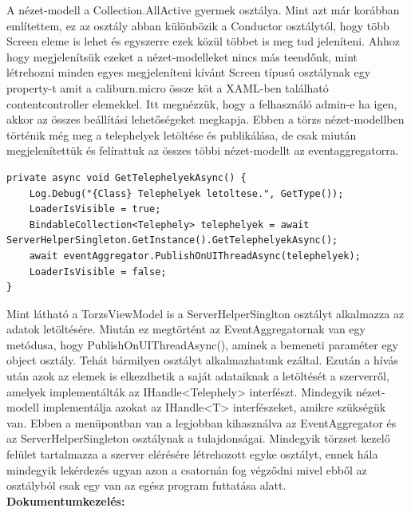 \documentclass[
]{thesis-ekf}
\theoremstyle{definition}
\theoremstyle{remark}
\begin{document}
A nézet-modell a Collection.AllActive gyermek osztálya. Mint azt már korábban említettem, ez az osztály abban különbözik a Conductor osztálytól, hogy több Screen eleme is lehet és egyszerre ezek közül többet is meg tud jeleníteni. Ahhoz hogy megjelenítsük ezeket a nézet-modelleket nincs más teendőnk, mint létrehozni minden egyes megjeleníteni kívánt Screen típusú osztálynak egy property-t amit a caliburn.micro össze köt a XAML-ben található contentcontroller elemekkel. Itt megnézzük, hogy a felhasználó admin-e ha igen, akkor az összes beállítási lehetőségeket megkapja. Ebben a törzs nézet-modellben történik még meg a telephelyek letöltése és publikálása, de csak miután megjelenítettük és felírattuk az összes többi nézet-modellt az eventaggregatorra. 
\begin{lstlisting}[showstringspaces=false,caption={Telephelyek letöltése a törzs adatok számára.},captionpos=b]
private async void GetTelephelyekAsync() {
	Log.Debug("{Class} Telephelyek letoltese.", GetType());
	LoaderIsVisible = true;
	BindableCollection<Telephely> telephelyek = await 	ServerHelperSingleton.GetInstance().GetTelephelyekAsync();
	await eventAggregator.PublishOnUIThreadAsync(telephelyek);
	LoaderIsVisible = false;
}
\end{lstlisting}

Mint látható a TorzsViewModel is a ServerHelperSinglton osztályt alkalmazza az adatok letöltésére. Miután ez megtörtént az EventAggregatornak van egy metódusa, hogy PublishOnUIThreadAsync(), aminek a bemeneti paraméter egy object osztály. Tehát bármilyen osztályt alkalmazhatunk ezáltal. Ezután a hívás után azok az elemek is elkezdhetik a saját adataiknak a letöltését a szerverről, amelyek implementálták az IHandle<Telephely> interfészt. Mindegyik nézet-modell implementálja azokat az IHandle<T> interfészeket, amikre szükségük van. Ebben a menüpontban van a legjobban kihasználva az EventAggregator és az ServerHelperSingleton osztálynak a tulajdonságai.  Mindegyik törzset kezelő felület tartalmazza a szerver elérésére létrehozott egyke osztályt, ennek hála mindegyik lekérdezés ugyan azon a csatornán fog végződni mivel ebből az osztályból csak egy van az egész program futtatása alatt. \\

\textbf{Dokumentumkezelés:}
\end{document}
